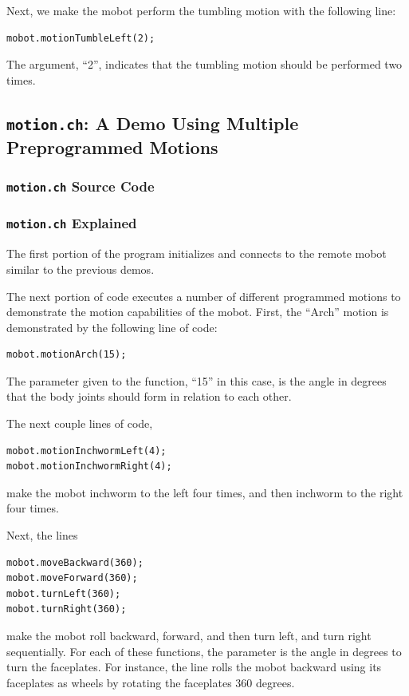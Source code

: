 \documentclass{article}
\begin{document}
Next, we make the mobot perform the tumbling motion with the following line:
\begin{verbatim}
mobot.motionTumbleLeft(2);
\end{verbatim}
The argument, ``2'', indicates that the tumbling motion should be performed
two times.

\subsection{\texttt{motion.ch}: A Demo Using Multiple Preprogrammed Motions}
\subsubsection{\texttt{motion.ch} Source Code}

\subsubsection{\texttt{motion.ch} Explained}
The first portion of the program initializes and connects to the
remote mobot similar to the previous demos.

The next portion of code executes a number of different programmed motions
to demonstrate the motion capabilities of the mobot. First, the ``Arch'' motion
is demonstrated by the following line of code:
\begin{verbatim}
mobot.motionArch(15);
\end{verbatim}
The parameter given to the function, ``15'' in this case, is the angle in degrees 
that the body joints should form in relation to each other. 

The next couple lines of code,
\begin{verbatim}
mobot.motionInchwormLeft(4);
mobot.motionInchwormRight(4);
\end{verbatim}
make the mobot inchworm to the left four times, and then inchworm to the right
four times. 

Next, the lines
\begin{verbatim}
mobot.moveBackward(360);
mobot.moveForward(360);
mobot.turnLeft(360);
mobot.turnRight(360);
\end{verbatim}
make the mobot roll backward, forward, and then turn left, and turn right
sequentially. For each of these functions, the parameter is the angle in degrees
to turn the faceplates. For instance, the line rolls the mobot backward
using its faceplates as wheels by rotating the faceplates 360 degrees.
\end{document}
